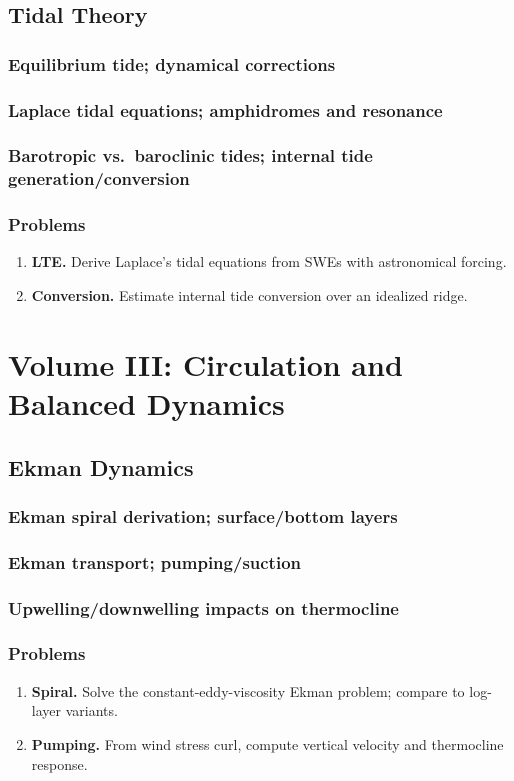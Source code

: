 \documentclass[12pt]{book}
\begin{document}
\chapter{Tidal Theory}
\section{Equilibrium tide; dynamical corrections}
\section{Laplace tidal equations; amphidromes and resonance}
\section{Barotropic vs.\ baroclinic tides; internal tide generation/conversion}
\section*{Problems}
\begin{enumerate}
  \item \textbf{LTE.} Derive Laplace’s tidal equations from SWEs with astronomical forcing.
  \item \textbf{Conversion.} Estimate internal tide conversion over an idealized ridge.
\end{enumerate}

\part{Volume III: Circulation and Balanced Dynamics}

\chapter{Ekman Dynamics}
\section{Ekman spiral derivation; surface/bottom layers}
\section{Ekman transport; pumping/suction}
\section{Upwelling/downwelling impacts on thermocline}
\section*{Problems}
\begin{enumerate}
  \item \textbf{Spiral.} Solve the constant-eddy-viscosity Ekman problem; compare to log-layer variants.
  \item \textbf{Pumping.} From wind stress curl, compute vertical velocity and thermocline response.
\end{enumerate}
\end{document}
